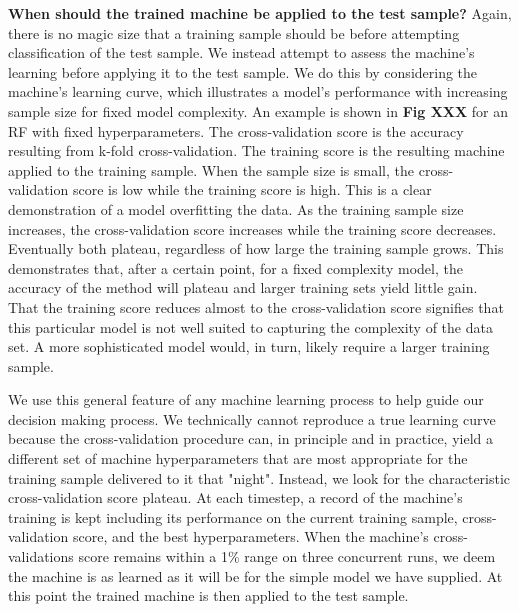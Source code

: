 \documentclass[twocolumn]{aastex6}
\begin{document}
\textbf{When should the trained machine be applied to the test sample?} Again, there is
no magic size that a training sample should be before attempting classification
of the test sample. We instead attempt to assess the machine's learning
before applying it to the test sample. We do this by considering the machine's
learning curve, which illustrates a model's performance with 
increasing sample size for fixed model complexity. An example is shown in \textbf{Fig XXX}
for an RF with fixed hyperparameters. The cross-validation score is the accuracy
resulting from k-fold cross-validation. The training score is the resulting machine
applied to the training sample. When the sample size is small, the cross-validation
score is low while the training score is high. This is a clear demonstration of a model
overfitting the data. As the training sample size 
increases, the cross-validation score increases while the training score decreases. 
Eventually both plateau, regardless of how large the training sample grows. This 
demonstrates that, after a certain point, for a fixed complexity model, the accuracy
of the method will plateau and larger training sets yield little gain. That the training
score reduces almost to the cross-validation score signifies that this particular
model is not well suited to capturing the complexity of the data set. 
A more sophisticated model would, in turn, likely require a larger training
sample. 

We use this general feature of any machine learning process to help guide our 
decision making process. We technically cannot reproduce a true learning curve
because the cross-validation procedure can, in principle and in practice, yield a
different set of machine hyperparameters that are most appropriate for the training
sample delivered to it that "night".  Instead, we look for the characteristic 
cross-validation score plateau. At each timestep, a record of the machine's 
training is kept including its performance on the current training sample, 
cross-validation score, and the best hyperparameters. When the machine's 
cross-validations score remains within a 1\% range on three concurrent runs, 
we deem the machine is as learned as it will be for the simple model we have 
supplied. At this point the trained machine is then applied to the test sample. 
\end{document}
